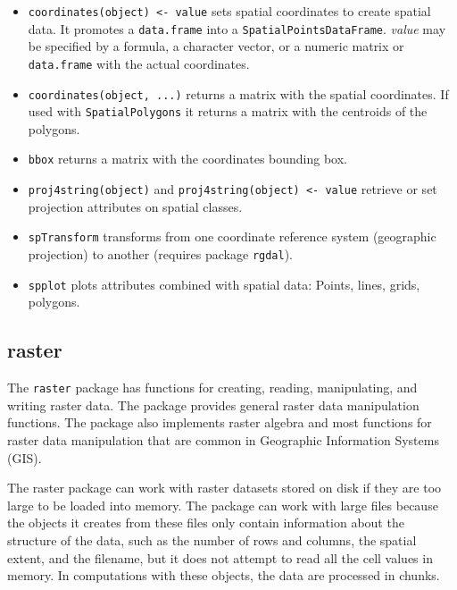 \documentclass[smallroyalvopaper]{memoir}
\begin{document}
\begin{itemize}
\item \texttt{coordinates(object) <- value} sets spatial coordinates to create spatial data. It promotes a \texttt{data.frame} into a \texttt{SpatialPointsDataFrame}. \emph{value} may be specified by a formula, a character vector, or a numeric matrix or \texttt{data.frame} with the actual coordinates.

\item \texttt{coordinates(object, ...)} returns a matrix with the spatial coordinates. If used with \texttt{SpatialPolygons} it returns a matrix with the centroids of the polygons.

\item \texttt{bbox} returns a matrix with the coordinates bounding box.

\item \texttt{proj4string(object)} and \texttt{proj4string(object) <- value} retrieve or set projection attributes on spatial classes.

\item \texttt{spTransform} transforms from one coordinate reference system (geographic projection) to another (requires package \texttt{rgdal}).

\item \texttt{spplot} plots attributes combined with spatial data: Points, lines, grids, polygons.
\end{itemize}

\subsection{raster}
\label{sec:org44372d7}
\label{sec:raster}


The \texttt{raster} package \cite{Hijmans2013} has functions for creating, reading, manipulating, and writing raster data. The package provides general raster data manipulation functions. The package also implements raster algebra and most functions for raster data manipulation that are common in Geographic Information Systems (GIS).

The raster package can work with raster datasets stored on disk if they are too large to be loaded into memory. The package can work with large files because the objects it creates from these files only contain information about the structure of the data, such as the number of rows and columns, the spatial extent, and the filename, but it does not attempt to read all the cell values in memory. In computations with these objects, the data are processed in chunks.
\end{document}
